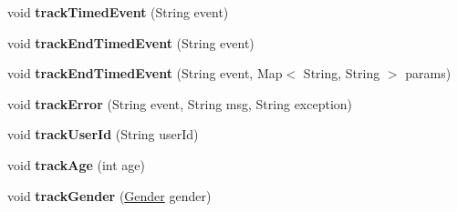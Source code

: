 \begin{DoxyCompactItemize}
\item 
\hypertarget{classcom_1_1spilgames_1_1framework_1_1tracking_1_1impl_1_1_base_tracker_a788759a2cbfea02eab8e8e322f20553f}{void {\bfseries track\-Timed\-Event} (String event)}\label{classcom_1_1spilgames_1_1framework_1_1tracking_1_1impl_1_1_base_tracker_a788759a2cbfea02eab8e8e322f20553f}

\item 
\hypertarget{classcom_1_1spilgames_1_1framework_1_1tracking_1_1impl_1_1_base_tracker_a9d6f0d48391512946136e4da693c6269}{void {\bfseries track\-End\-Timed\-Event} (String event)}\label{classcom_1_1spilgames_1_1framework_1_1tracking_1_1impl_1_1_base_tracker_a9d6f0d48391512946136e4da693c6269}

\item 
\hypertarget{classcom_1_1spilgames_1_1framework_1_1tracking_1_1impl_1_1_base_tracker_ac044eeeeec9083b9b8909fedc3c705e1}{void {\bfseries track\-End\-Timed\-Event} (String event, Map$<$ String, String $>$ params)}\label{classcom_1_1spilgames_1_1framework_1_1tracking_1_1impl_1_1_base_tracker_ac044eeeeec9083b9b8909fedc3c705e1}

\item 
\hypertarget{classcom_1_1spilgames_1_1framework_1_1tracking_1_1impl_1_1_base_tracker_aa07e953231e8660893a527c44be1dc30}{void {\bfseries track\-Error} (String event, String msg, String exception)}\label{classcom_1_1spilgames_1_1framework_1_1tracking_1_1impl_1_1_base_tracker_aa07e953231e8660893a527c44be1dc30}

\item 
\hypertarget{classcom_1_1spilgames_1_1framework_1_1tracking_1_1impl_1_1_base_tracker_a9e262e501c7dc46619b6b02581bff6df}{void {\bfseries track\-User\-Id} (String user\-Id)}\label{classcom_1_1spilgames_1_1framework_1_1tracking_1_1impl_1_1_base_tracker_a9e262e501c7dc46619b6b02581bff6df}

\item 
\hypertarget{classcom_1_1spilgames_1_1framework_1_1tracking_1_1impl_1_1_base_tracker_ae7e862518960ef0eda497f5c680b3c9e}{void {\bfseries track\-Age} (int age)}\label{classcom_1_1spilgames_1_1framework_1_1tracking_1_1impl_1_1_base_tracker_ae7e862518960ef0eda497f5c680b3c9e}

\item 
\hypertarget{classcom_1_1spilgames_1_1framework_1_1tracking_1_1impl_1_1_base_tracker_a633c6db76772795f8f67b3a28715ce4e}{void {\bfseries track\-Gender} (\hyperlink{enumcom_1_1spilgames_1_1framework_1_1core_1_1_gender}{Gender} gender)}\label{classcom_1_1spilgames_1_1framework_1_1tracking_1_1impl_1_1_base_tracker_a633c6db76772795f8f67b3a28715ce4e}


\end{DoxyCompactItemize}
